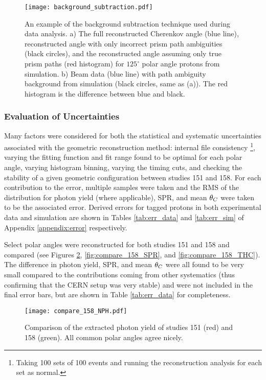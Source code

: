 \begin{figure}[!htb]
	\centering
	\texttt{[image: background\_subtraction.pdf]}
	\caption[An example of the background subtraction technique used during data analysis.]{An example of the background subtraction technique used during data analysis. a) The full reconstructed Cherenkov angle (blue line), reconstructed angle with only incorrect prism path ambiguities (black circles), and the reconstructed angle assuming only true prism paths (red histogram) for $125^\circ$ polar angle protons from simulation. b) Beam data (blue line) with path ambiguity background from simulation (black circles, same as (a)). The red histogram is the difference between blue and black.}
	\label{fig:background_sub}
\end{figure}

\subsubsection{Evaluation of Uncertainties}
Many factors were considered for both the statistical and systematic uncertainties associated with the geometric reconstruction method: internal file consistency \footnote{Taking 100 sets of 100 events and running the reconstruction analysis for each set as normal.}, varying the fitting function and fit range found to be optimal for each polar angle, varying histogram binning, varying the timing cuts, and checking the stability of a given geometric configuration between studies 151 and 158. For each contribution to the error, multiple samples were taken and the RMS of the distribution for photon yield (where applicable), SPR, and mean $\theta_{C}$ were taken to be the associated error. Derived errors for tagged protons in both experimental data and simulation are shown in Tables \ref{tab:err_data} and \ref{tab:err_sim} of Appendix \ref{appendix:error} respectively.

Select polar angles were reconstructed for both studies 151 and 158 and compared (see Figures \ref{fig:compare_158_NPH}, \ref{fig:compare_158_SPR}, and \ref{fig:compare_158_THC}). The difference in photon yield, SPR, and mean $\theta_{C}$ were all found to be very small compared to the contributions coming from other systematics (thus confirming that the CERN setup was very stable) and were not included in the final error bars, but are shown in Table \ref{tab:err_data} for completeness.

\begin{figure}[!htb]
	\centering
	\texttt{[image: compare\_158\_NPH.pdf]}
	\caption{Comparison of the extracted photon yield of studies 151 (red) and 158 (green). All common polar angles agree nicely.}
	\label{fig:compare_158_NPH}
\end{figure}

